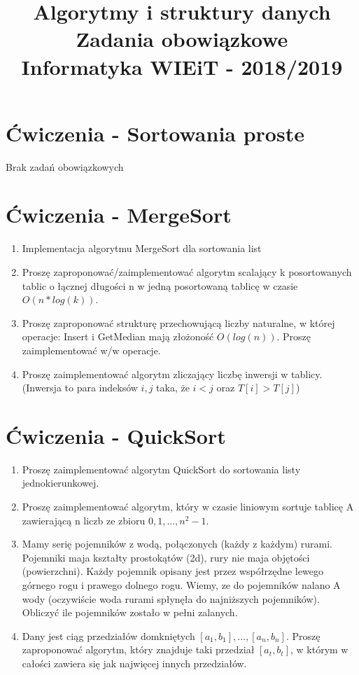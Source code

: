 \documentclass[11pt]{article}
\title{
	\textbf{
		\LARGE{Algorytmy i struktury danych}\linebreak \\
		\large{Zadania obowiązkowe} \\
		\normalsize{Informatyka WIEiT - 2018/2019 }} \\
}
\author{}
\date{}
\begin{document}
\lstset{language=C++,
	texcl=true,
	inputencoding=utf8,
	extendedchars=\true,
	}


\maketitle

\section{Ćwiczenia - Sortowania proste}
	Brak zadań obowiązkowych
\section{Ćwiczenia - MergeSort}

\begin{enumerate}
	\item Implementacja algorytmu MergeSort dla sortowania list
	
	\item Proszę zaproponować/zaimplementować algorytm scalający k posortowanych tablic o łącznej długości n
	w jedną posortowaną tablicę w czasie $O(n*log(k))$.
	
	\item Proszę zaproponować strukturę przechowującą liczby naturalne, w której operacje:
	Insert i GetMedian mają złożoność $O(log(n))$.
	Proszę zaimplementować w/w operacje.
	
	\item Proszę zaimplementować algorytm zliczający liczbę inwersji w tablicy.
	(Inwersja to para indeksów $i,j$ taka, że $ i<j $ oraz $T[i]>T[j] $)
\end{enumerate}

\section{Ćwiczenia - QuickSort}

\begin{enumerate}
	\item Proszę zaimplementować algorytm QuickSort do sortowania listy jednokierunkowej.
	
	\item Proszę zaimplementować algorytm, który w czasie liniowym sortuje tablicę A zawierającą n liczb ze zbioru $ 0,1, ... ,n^2-1 $.
	
	\item Mamy serię pojemników z wodą, połączonych (każdy z każdym) rurami.
	Pojemniki maja kształty prostokątów (2d), rury nie maja objętości (powierzchni).
	Każdy pojemnik opisany jest przez współrzędne lewego górnego rogu i prawego dolnego rogu.
	Wiemy, ze do pojemników nalano A wody (oczywiście woda rurami spłynęła do najniższych pojemników).
	Obliczyć ile pojemników zostało w pełni zalanych.
	
	\item Dany jest ciąg przedziałów domkniętych $ [a_{1}, b_{1}], . . . ,[a_{n}, b_{n}]$.
	Proszę zaproponować algorytm, który znajduje taki przedział $[a_{t}, b_{t}]$,
	w którym w całości zawiera się jak najwięcej innych przedziałów.
\end{enumerate}
\end{document}
